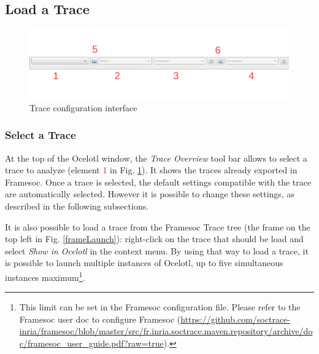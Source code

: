 \documentclass[twoside]{article}
\begin{document}
\begin{sloppypar}
\subsection{Load a Trace}
\begin{figure}[h!]
	\centering
	\includegraphics[width=\textwidth]{images/traceSelection_labeled.pdf}
	\caption{Trace configuration interface}
	\label{traceConf}
\end{figure}

\subsubsection{Select a Trace}

At the top of the Ocelotl window, the \textit{Trace Overview} tool bar allows to select a trace to analyze (element \textcolor{red}{1} in Fig. \ref{traceConf}). It shows the traces already exported in Framesoc. Once a trace is selected, the default settings compatible with the trace are automatically selected. However it is possible to change these settings, as described in the following subsections. 

It is also possible to load a trace from the Framesoc Trace tree (the frame on the top left in Fig. \ref{frameLaunch}): right-click on the trace that should be load and select \textit{Show in Ocelotl} in the context menu. By using that way to load a trace, it is possible to launch multiple instances of Ocelotl, up to five simultaneous instances maximum\footnote{This limit can be set in the Framesoc configuration file. Please refer to the Framesoc user doc to configure Framesoc (\url{https://github.com/soctrace-inria/framesoc/blob/master/src/fr.inria.soctrace.maven.repository/archive/doc/framesoc_user_guide.pdf?raw=true}).}.


\end{sloppypar}
\end{document}
